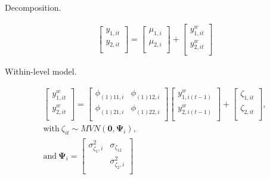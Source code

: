 \documentclass[
]{article}
\author{}
\date{\vspace{-2.5em}}
\begin{document}
\begin{center}
Decomposition.
\end{center}

\[
\begin{gathered} \begin{bmatrix}
y_{1, it} \\
y_{2, it} \\
\end{bmatrix} = \begin{bmatrix}
\mu_{1,i} \\
\mu_{2,i} \\
\end{bmatrix}
+
\begin{bmatrix}
y_{1, it}^w \\
y_{2, it}^w \\
\end{bmatrix} \end{gathered}
\] \vspace{1em}

\begin{center} Within-level model. \end{center}

\[
\begin{gathered} \begin{bmatrix}
y_{1, it}^w \\
y_{2, it}^w \\
\end{bmatrix} = \begin{bmatrix} \phi_{(1)11,i} & 
\phi_{(1)12,i} \\
\phi_{(1)21,i} & 
\phi_{(1)22,i} \\ \end{bmatrix} \begin{bmatrix} y_{1,i(t - 1)}^w \\
y_{2,i(t - 1)}^w \\ \end{bmatrix} +  \begin{bmatrix} \zeta_{1, it} \\
\zeta_{2, it} \\ \end{bmatrix} ,\\ 
\text{with}~\zeta_{it} \sim \mathit{MVN}(\mathbf{0}, \mathbf{\Psi}_i) , \\ 
\text{and}~\mathbf{\Psi} _i  =  \begin{bmatrix} \sigma^2_{\zeta_{1},i} &
\sigma_{\zeta_{12}} \\
 & 
\sigma^2_{\zeta_{2},i} \\ \end{bmatrix} \end{gathered}
\] \vspace{1em}
\end{document}

